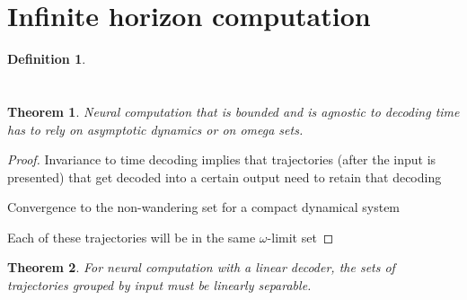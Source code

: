 \documentclass{article}
\title{}
\author{\'Abel S\'agodi}
\date{September 1, 2023}
\newtheorem{theorem}{Theorem}
\theoremstyle{definition}
\newtheorem{definition}{Definition}
\theoremstyle{remark}
\begin{document}
\maketitle

\section{Infinite horizon computation}	
\begin{definition}

\end{definition}

\section{}
\begin{theorem}
Neural computation that is bounded and is agnostic to decoding time has to rely on asymptotic dynamics or on omega sets.
\end{theorem}

\begin{proof}
Invariance to time decoding implies that trajectories (after the input is presented) that get decoded into a certain output need to retain that decoding

Convergence to the non-wandering set for a compact dynamical system

Each of these trajectories will be in the same $\omega$-limit set
\end{proof}




\begin{theorem}
For neural computation with a linear decoder, the sets of trajectories grouped by input must be linearly separable.
\end{theorem}


% 
% 
\end{document}
